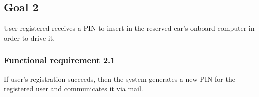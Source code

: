 \subsection{Goal 2}
User registered receives a PIN to insert in the reserved car's onboard computer in order to drive it.

\setcounter{secnumdepth}{3}
\subsubsection{Functional requirement 2.1}
If user's registration succeeds, then the system generates a new PIN for the registered user and communicates it via mail.